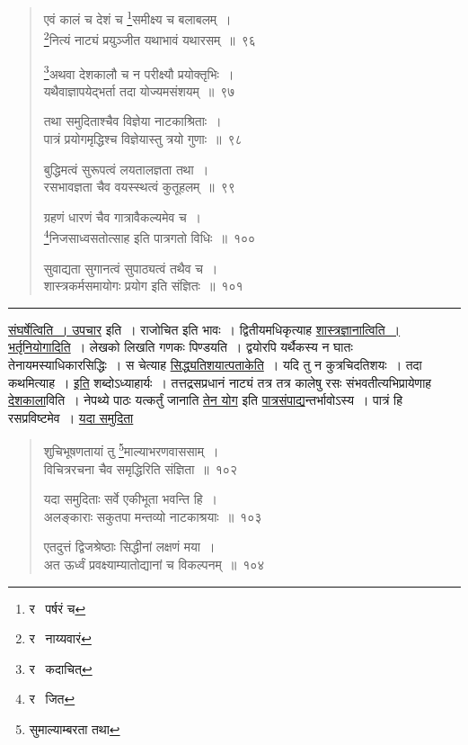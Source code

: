 \documentclass[11pt, openany]{book}
\begin{document}
\begin{quote}
{\na एवं कालं च देशं च \renewcommand{\thefootnote}{1}\footnote{र \textendash\  पर्षरं च}समीक्ष्य च बलाबलम्~।\\
\renewcommand{\thefootnote}{2}\footnote{र \textendash\  नाय्यवारं}नित्यं नाट्यं प्रयुञ्जीत यथाभावं यथारसम्~॥~९६

\renewcommand{\thefootnote}{3}\footnote{र \textendash\  कदाचित्}अथवा देशकालौ च न परीक्ष्यौ प्रयोक्तृभिः~।\\
यथैवाज्ञापयेद्भर्ता तदा योज्यमसंशयम्~॥~९७

तथा समुदिताश्चैव विज्ञेया नाटकाश्रिताः~।\\
पात्रं प्रयोगमृद्धिश्च विज्ञेयास्तु त्रयो गुणाः~॥~९८

बुद्धिमत्वं सुरूपत्वं लयतालज्ञता तथा~।\\
रसभावज्ञता चैव वयस्स्थत्वं कुतूहलम्~॥~९९

ग्रहणं धारणं चैव गात्रावैकल्यमेव च~।\\
\renewcommand{\thefootnote}{4}\footnote{र \textendash\  जित}निजसाध्वसतोत्साह इति पात्रगतो विधिः~॥~१००

सुवाद्यता सुगानत्वं सुपाठ्यत्वं तथैव च~।\\
शास्त्रकर्मसमायोगः प्रयोग इति संज्ञितः~॥~१०१}
\end{quote}

\hrule

\vspace{2mm}
\begin{sloppypar}
\underline{संघर्षेत्विति~। उपचार} इति~। राजोचित इति भावः~। द्वितीयमधिकृत्याह \underline{शास्त्रज्ञानात्विति~। भर्तृनियोगादिति}~। लेखको लिखति गणकः पिण्डयति~। द्वयोरपि यर्थैकस्य न घातः तेनायमस्याधिकारसिद्धिः~। स चेत्याह \underline{सिद्ध्यतिशयात्पताकेति}~। यदि तु न कुत्रचिदतिशयः~। तदा कथमित्याह~। \underline{इति} शब्दोऽध्याहार्यः~। तत्तद्रसप्रधानं नाट्यं तत्र तत्र कालेषु रसः संभवतीत्यभिप्रायेणाह \underline{देशकाला}विति~। नेपथ्ये पाठः यत्कर्तुं जानाति \underline{तेन योग} इति \underline{पात्रसंपाद्य}न्तर्भावोऽस्य~। पात्रं हि रसप्रविष्टमेव~। \underline{यदा समुदिता}
\end{sloppypar}

\newpage

\begin{quote}
{\na शुचिभूषणतायां तु \renewcommand{\thefootnote}{1}\footnote{सुमाल्याम्बरता तथा}माल्याभरणवाससाम्~।\\
विचित्ररचना चैव समृद्धिरिति संज्ञिता~॥~१०२

यदा समुदिताः सर्वे एकीभूता भवन्ति हि~।\\
अलङ्काराः सकुतपा मन्तव्यो नाटकाश्रयाः~॥~१०३

एतदुत्तं द्विजश्रेष्ठाः सिद्धीनां लक्षणं मया~।\\
अत ऊर्ध्वं प्रवक्ष्याम्यातोद्यानां च विकल्पनम्~॥~१०४}
\end{quote}
\end{document}
